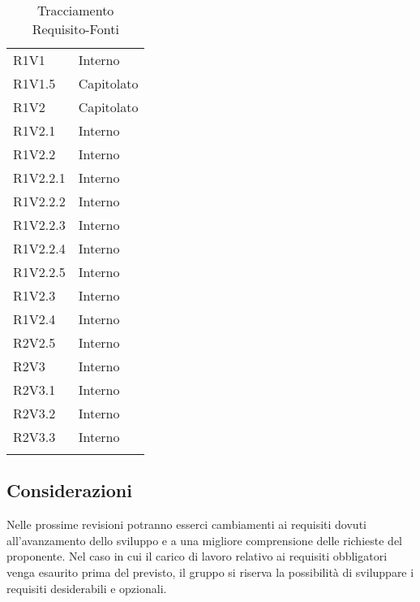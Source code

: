 \begin{longtable} {
			>{\centering}p{28mm}  
			>{}p{20mm}
		}
		R1V1 & Interno \TBstrut \\ [2mm]
		R1V1.5 & Capitolato \TBstrut \\ [2mm]
		R1V2 & Capitolato \TBstrut \\ [2mm]
		R1V2.1 & Interno \TBstrut \\ [2mm]
		R1V2.2 & Interno \TBstrut \\ [2mm]
		R1V2.2.1 & Interno \TBstrut \\ [2mm]
		R1V2.2.2 & Interno \TBstrut \\ [2mm]
		R1V2.2.3 & Interno \TBstrut \\ [2mm]
		R1V2.2.4 & Interno \TBstrut \\ [2mm]
		R1V2.2.5 & Interno \TBstrut \\ [2mm]
		R1V2.3 & Interno \TBstrut \\ [2mm]
		R1V2.4 & Interno \TBstrut \\ [2mm]
		R2V2.5 & Interno \TBstrut \\ [2mm]
		R2V3 & Interno \TBstrut \\ [2mm]
		R2V3.1 & Interno  \TBstrut \\ [2mm]		
		R2V3.2 & Interno  \TBstrut \\ [2mm]		
		R2V3.3 & Interno  \TBstrut \\ [2mm]		
		\rowcolor{white}
		\caption{Tracciamento Requisito-Fonti}
	\end{longtable}
	\subsection{Considerazioni}
	Nelle prossime revisioni potranno esserci cambiamenti ai requisiti dovuti all'avanzamento dello sviluppo e a una migliore comprensione delle richieste del proponente. Nel caso in cui il carico di lavoro relativo ai requisiti obbligatori venga esaurito prima del previsto, il gruppo si riserva la possibilità di sviluppare i requisiti desiderabili e opzionali.